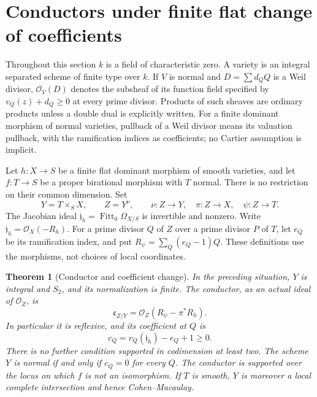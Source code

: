 \documentclass[11pt,reqno]{amsart}
\numberwithin{equation}{section}
\newtheorem{theorem}{Theorem}[section]
\theoremstyle{definition}\newtheorem{definition}[theorem]{Definition}
\theoremstyle{remark}\newtheorem{remark}[theorem]{Remark}
\newcommand{\OO}{\mathcal O}\newcommand{\II}{\mathcal I}
\begin{document}
\section{Conductors under finite flat change of coefficients}
\label{sec:duality-base-change-v171}
Throughout this section $k$ is a field of characteristic zero. A variety is
an integral separated scheme of finite type over $k$. If $V$ is normal and
$D=\sum d_QQ$ is a Weil divisor, $\OO_V(D)$ denotes the subsheaf of its
function field specified by $v_Q(z)+d_Q\geq0$ at every prime divisor.
Products of such sheaves are ordinary products unless a double dual is
explicitly written. For a finite dominant morphism of normal varieties,
pullback of a Weil divisor means its valuation pullback, with the
ramification indices as coefficients; no Cartier assumption is implicit.

Let $h:X\to S$ be a finite flat dominant morphism of smooth varieties,
and let $f:T\to S$ be a proper birational morphism with $T$ normal.
There is no restriction on their common dimension. Set
\[
 Y=T\times_S X,\qquad Z=Y^\nu,
 \qquad \nu:Z\longrightarrow Y,\quad
 \pi:Z\longrightarrow X,\quad \psi:Z\longrightarrow T.
\]
The Jacobian ideal $\mathfrak j_h=\operatorname{Fitt}_0\Omega_{X/S}$ is
invertible and nonzero. Write $\mathfrak j_h=\OO_X(-R_h)$. For a prime
divisor $Q$ of $Z$ over a prime divisor $P$ of $T$, let $e_Q$ be its
ramification index, and put $R_\psi=\sum_Q(e_Q-1)Q$.
These definitions use the morphisms, not choices of local coordinates.

\begin{theorem}[Conductor and coefficient change]
\label{thm:duality-conductor-v171}
In the preceding situation, $Y$ is integral and $S_2$, and its
normalization is finite. The conductor, as an actual ideal of $\OO_Z$, is
\begin{equation}\label{eq:duality-conductor-v171}
 \mathfrak c_{Z/Y}
 =\OO_Z(R_\psi-\pi^*R_h).
\end{equation}
In particular it is reflexive, and its coefficient at $Q$ is
\begin{equation}\label{eq:jacobian-order-v171}
 c_Q=v_Q(\mathfrak j_h)-e_Q+1\geq0.
\end{equation}
There is no further condition supported in codimension at least two.
The scheme $Y$ is normal if and only if $c_Q=0$ for every $Q$.
The conductor is supported over the locus on which $f$ is not an
isomorphism. If $T$ is smooth, $Y$ is moreover a local complete
intersection and hence Cohen--Macaulay.
\end{theorem}
\end{document}
